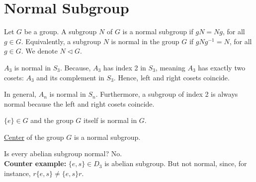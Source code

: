 \section{Normal Subgroup}
\begin{definition}
    Let $G$ be a group. A subgroup $N$ of $G$ is a normal subgroup if $gN = Ng$, for all $g \in G$. Equivalently, a subgroup $N$ is normal in the group $G$ if $gNg^{-1} = N$, for all $g \in G$. We denote $N\lhd G$.
\end{definition}
\begin{eg}
    $A_3$ is normal in $S_3$. Because, $A_3$ has index 2 in $S_3$, meaning $A_3$ has exactly two cosets: $A_3$ and its complement in $S_3$. Hence, left and right cosets coincide.
\end{eg}
In general, $A_n$ is normal in $S_n$. Furthermore, a subgroup of index 2 is always normal because the left and right cosets coincide.
\begin{eg}
    $\{e\} \in G$ and the group $G$ itself is normal in $G$. 
\end{eg}
\begin{eg}[Center of $G$]
    \hyperref[def:center]{Center} of the group $G$ is a normal subgroup.
\end{eg}
\begin{remark}
    Is every abelian subgroup normal? No.\\
    \textbf{Counter example:} $\{e, s\} \in D_3$ is abelian subgroup. But not normal, since, for instance, $r\{e, s\} \neq \{e, s\}r$.
\end{remark}
